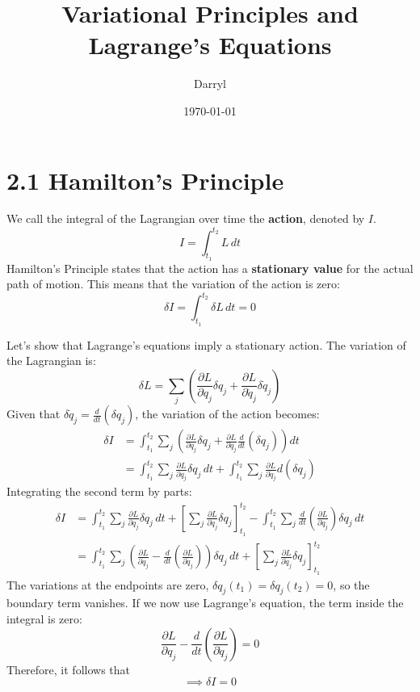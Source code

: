 \documentclass[12pt]{article}
\title{Variational Principles and Lagrange's Equations}
\author{Darryl}
\date{\today}
\begin{document}
	
	\maketitle
	
	\section*{2.1 Hamilton's Principle}
	We call the integral of the Lagrangian over time the \textbf{action}, denoted by $I$.
	\begin{equation*}
		I = \int_{t_1}^{t_2} L \, dt
	\end{equation*}
	Hamilton's Principle states that the action has a \textbf{stationary value} for the actual path of motion. This means that the variation of the action is zero:
	\begin{equation*}
		\delta I = \int_{t_1}^{t_2} \delta L \, dt = 0
	\end{equation*}
	
	Let's show that Lagrange's equations imply a stationary action. The variation of the Lagrangian is:
	\begin{equation*}
		\delta L = \sum_j \left( \frac{\partial L}{\partial q_j} \delta q_j + \frac{\partial L}{\partial \dot{q}_j} \delta \dot{q}_j \right)
	\end{equation*}
	Given that $\delta \dot{q}_j = \frac{d}{dt}(\delta q_j)$, the variation of the action becomes:
	\begin{align*}
		\delta I &= \int_{t_1}^{t_2} \sum_j \left( \frac{\partial L}{\partial q_j} \delta q_j + \frac{\partial L}{\partial \dot{q}_j} \frac{d}{dt}(\delta q_j) \right) dt \\
		&= \int_{t_1}^{t_2} \sum_j \frac{\partial L}{\partial q_j} \delta q_j \, dt + \int_{t_1}^{t_2} \sum_j \frac{\partial L}{\partial \dot{q}_j} d(\delta q_j)
	\end{align*}
	Integrating the second term by parts:
	\begin{align*}
		\delta I &= \int_{t_1}^{t_2} \sum_j \frac{\partial L}{\partial q_j} \delta q_j \, dt + \left[ \sum_j \frac{\partial L}{\partial \dot{q}_j} \delta q_j \right]_{t_1}^{t_2} - \int_{t_1}^{t_2} \sum_j \frac{d}{dt}\left(\frac{\partial L}{\partial \dot{q}_j}\right) \delta q_j \, dt \\
		&= \int_{t_1}^{t_2} \sum_j \left( \frac{\partial L}{\partial q_j} - \frac{d}{dt}\left(\frac{\partial L}{\partial \dot{q}_j}\right) \right) \delta q_j \, dt + \left[ \sum_j \frac{\partial L}{\partial \dot{q}_j} \delta q_j \right]_{t_1}^{t_2}
	\end{align*}
	The variations at the endpoints are zero, $\delta q_j(t_1) = \delta q_j(t_2) = 0$, so the boundary term vanishes. If we now use Lagrange's equation, the term inside the integral is zero:
	\begin{equation*}
		\frac{\partial L}{\partial q_j} - \frac{d}{dt}\left(\frac{\partial L}{\partial \dot{q}_j}\right) = 0
	\end{equation*}
	Therefore, it follows that
	\begin{equation*}
		\implies \delta I = 0
	\end{equation*}
	
\end{document}
